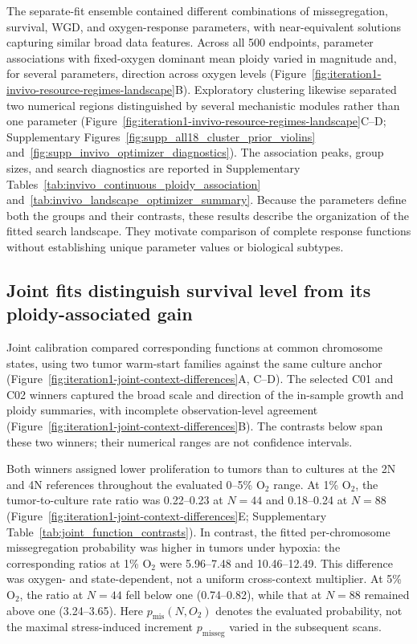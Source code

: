 \documentclass[11pt]{article}
\begin{document}
The separate-fit ensemble contained different combinations of missegregation, survival, WGD, and oxygen-response parameters, with near-equivalent solutions capturing similar broad data features. Across all 500 endpoints, parameter associations with fixed-oxygen dominant mean ploidy varied in magnitude and, for several parameters, direction across oxygen levels (Figure~\ref{fig:iteration1-invivo-resource-regimes-landscape}B). Exploratory clustering likewise separated two numerical regions distinguished by several mechanistic modules rather than one parameter (Figure~\ref{fig:iteration1-invivo-resource-regimes-landscape}C--D; Supplementary Figures~\ref{fig:supp_all18_cluster_prior_violins} and~\ref{fig:supp_invivo_optimizer_diagnostics}). The association peaks, group sizes, and search diagnostics are reported in Supplementary Tables~\ref{tab:invivo_continuous_ploidy_association} and~\ref{tab:invivo_landscape_optimizer_summary}. Because the parameters define both the groups and their contrasts, these results describe the organization of the fitted search landscape. They motivate comparison of complete response functions without establishing unique parameter values or biological subtypes.

\subsection*{Joint fits distinguish survival level from its ploidy-associated gain}

Joint calibration compared corresponding functions at common chromosome states, using two tumor warm-start families against the same culture anchor (Figure~\ref{fig:iteration1-joint-context-differences}A, C--D). The selected C01 and C02 winners captured the broad scale and direction of the in-sample growth and ploidy summaries, with incomplete observation-level agreement (Figure~\ref{fig:iteration1-joint-context-differences}B). The contrasts below span these two winners; their numerical ranges are not confidence intervals.

Both winners assigned lower proliferation to tumors than to cultures at the 2N and 4N references throughout the evaluated 0--5\% O$_2$ range. At 1\% O$_2$, the tumor-to-culture rate ratio was 0.22--0.23 at $N=44$ and 0.18--0.24 at $N=88$ (Figure~\ref{fig:iteration1-joint-context-differences}E; Supplementary Table~\ref{tab:joint_function_contrasts}). In contrast, the fitted per-chromosome missegregation probability was higher in tumors under hypoxia: the corresponding ratios at 1\% O$_2$ were 5.96--7.48 and 10.46--12.49. This difference was oxygen- and state-dependent, not a uniform cross-context multiplier. At 5\% O$_2$, the ratio at $N=44$ fell below one (0.74--0.82), while that at $N=88$ remained above one (3.24--3.65). Here $p_{\mathrm{mis}}(N,O_2)$ denotes the evaluated probability, not the maximal stress-induced increment $p_{\mathrm{misseg}}$ varied in the subsequent scans.
\end{document}
